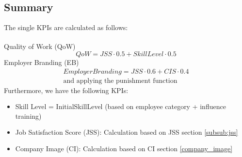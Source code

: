 \subsection{Summary}

The single KPIs are calculated as follows:\\\\
Quality of Work (\gls{QoW})
\begin{equation}
     QoW = JSS \cdot 0.5 + SkillLevel \cdot 0.5   
     \label{QoW}
\end{equation}
Employer Branding (\gls{EB})
\begin{equation}
  \begin{array}{l}
     Employer Branding = JSS \cdot 0.6 + CIS \cdot 0.4 \\ 
    \text{and applying the punishment function} 
  \end{array}
\end{equation}
Furthermore, we have the following KPIs:
\begin{itemize}
\item Skill Level = InitialSkillLevel (based on employee category + influence training)
\item Job Satisfaction Score (JSS): Calculation based on JSS section \ref{subsub:jss}
\item Company Image (CI): Calculation based on CI section \ref{company_image}
\end{itemize}